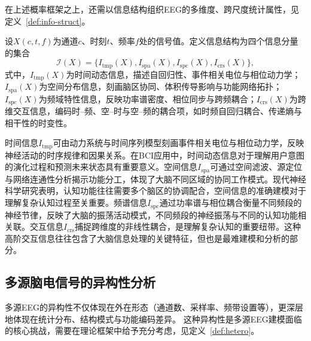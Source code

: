 在上述概率框架之上，还需以信息结构组织EEG的多维度、跨尺度统计属性，见定义~\ref{def:info-struct}。

\begin{definition}[EEG信号的信息结构]
\label{def:info-struct}
设$X(c,t,f)$为通道$c$、时刻$t$、频率$f$处的信号值。定义信息结构为四个信息分量的集合
\begin{equation}
\label{eq:info-struct}
\mathcal{I}(X) = \big\{ I_{\text{tmp}}(X), I_{\text{spa}}(X), I_{\text{spc}}(X), I_{\text{crs}}(X) \big\},
\end{equation}
式中，$I_{\text{tmp}}(X)$为时间动态信息，描述自回归性、事件相关电位与相位动力学；$I_{\text{spa}}(X)$为空间分布信息，刻画脑区协同、体积传导影响与功能网络拓扑；$I_{\text{spc}}(X)$为频域特性信息，反映功率谱密度、相位同步与跨频耦合；$I_{\text{crs}}(X)$为跨维交互信息，编码时--频、空--时与空--频的耦合项，如时频自回归耦合、传递熵与相干性的时变性。
\end{definition}

时间信息$I_{\text{tmp}}$可由动力系统与时间序列模型刻画事件相关电位与相位动力学，反映神经活动的时序规律和因果关系。在BCI应用中，时间动态信息对于理解用户意图的演化过程和预测未来状态具有重要意义。空间信息$I_{\text{spa}}$可通过空间滤波、源定位与网络连通性分析揭示功能分工，体现了大脑不同区域的协同工作模式。现代神经科学研究表明，认知功能往往需要多个脑区的协调配合，空间信息的准确建模对于理解复杂认知过程至关重要。频谱信息$I_{\text{spc}}$通过功率谱与相位耦合衡量不同频段的神经节律，反映了大脑的振荡活动模式，不同频段的神经振荡与不同的认知功能相关联。交互信息$I_{\text{crs}}$捕捉跨维度的非线性耦合，是理解复杂认知的重要纽带。这种高阶交互信息往往包含了大脑信息处理的关键特征，但也是最难建模和分析的部分。


\subsection{多源脑电信号的异构性分析}
多源EEG的异构性不仅体现在外在形态（通道数、采样率、频带设置等），更深层地体现在统计分布、结构模式与功能编码差异。
这种异构性是多源EEG建模面临的核心挑战，需要在理论框架中给予充分考虑，见定义~\ref{def:hetero}。

